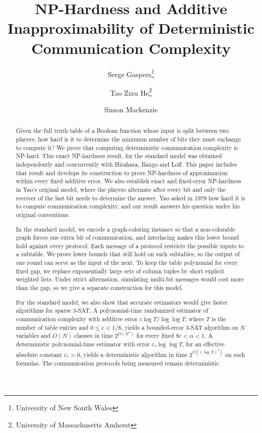 \documentclass[11pt,letterpaper]{article} \usepackage[utf8]{inputenc}
\theoremstyle{plain} \newtheorem{theorem}{Theorem}[section]
\theoremstyle{definition} \newaliascnt{definition}{theorem}
\begin{document}
\title{NP-Hardness and Additive Inapproximability of Deterministic Communication Complexity}
\author{Serge Gaspers\thanks{University of New South Wales} \and
Tao Zixu He\thanks{University of Massachusetts Amherst} \and
Simon Mackenzie\footnotemark[1]}
\date{}
\hypersetup{pageanchor=false}
\begin{titlepage}
\maketitle
\thispagestyle{empty}

\begin{abstract}
Given the full truth table of a Boolean function whose input is split
between two players, how hard is it to determine the minimum number of
bits they must exchange to compute it? We prove that computing
deterministic communication complexity is NP-hard. This exact NP-hardness result, for the standard model was obtained independently and concurrently
with Hirahara, Ilango and Loff. This paper includes that result and
develops its construction to prove NP-hardness of approximation within
every fixed additive error. We also establish exact and fixed-error
NP-hardness in Yao's original model, where the players alternate after
every bit and only the receiver of the last bit needs to determine the
answer. Yao asked in 1979 how hard it is to compute communication complexity,
and our result answers his question under his original conventions.

In the standard model, we encode a graph-coloring instance so that a
non-colorable graph forces one extra bit of communication, and interlacing
makes this lower bound hold against every protocol. Each message of a protocol restricts the possible inputs to a subtable. We prove lower bounds that still hold on such subtables, so the output of one round can serve as the input of the next. To keep the table polynomial
for every fixed gap, we replace exponentially large sets of column tuples
by short explicit weighted lists. Under strict alternation, simulating
multi-bit messages would cost more than the gap, so we give a separate construction for this model.

For the standard model, we also show that accurate estimators would give
faster algorithms for sparse $3$-SAT. A
polynomial-time randomized estimator of communication complexity with additive error
$c\log T/\log\log T$, where $T$ is the number of table entries and
$0\le c<1/8$, yields a bounded-error $3$-SAT algorithm on $N$ variables
and $O(N)$ clauses in time $2^{O(N^\alpha)}$ for every fixed
$8c<\alpha<1$. A deterministic polynomial-time estimator with error
$c_*\log\log T$, for an effective absolute constant $c_*>0$, yields a
deterministic algorithm in time $2^{O((\log N)^2)}$ on such formulas.
The communication protocols being measured remain deterministic.
\end{abstract}

\end{titlepage}
\setcounter{page}{1}
\hypersetup{pageanchor=true}
\end{document}
